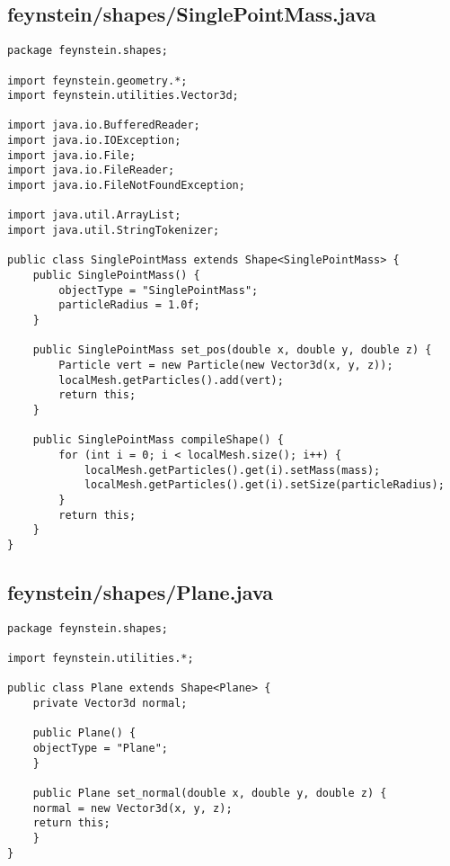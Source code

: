 \subsection*{feynstein/shapes/SinglePointMass.java}
\begin{lstlisting}
package feynstein.shapes;

import feynstein.geometry.*;
import feynstein.utilities.Vector3d;

import java.io.BufferedReader;
import java.io.IOException;
import java.io.File;
import java.io.FileReader;
import java.io.FileNotFoundException;

import java.util.ArrayList;
import java.util.StringTokenizer;

public class SinglePointMass extends Shape<SinglePointMass> {
	public SinglePointMass() {
		objectType = "SinglePointMass";
		particleRadius = 1.0f;
	}
    
	public SinglePointMass set_pos(double x, double y, double z) {
		Particle vert = new Particle(new Vector3d(x, y, z));
		localMesh.getParticles().add(vert);
		return this;
	}

    public SinglePointMass compileShape() {
		for (int i = 0; i < localMesh.size(); i++) {
			localMesh.getParticles().get(i).setMass(mass);
			localMesh.getParticles().get(i).setSize(particleRadius);
		}
		return this;
    }
}\end{lstlisting}

\subsection*{feynstein/shapes/Plane.java}
\begin{lstlisting}
package feynstein.shapes;

import feynstein.utilities.*;

public class Plane extends Shape<Plane> {
    private Vector3d normal;

    public Plane() {
	objectType = "Plane";
    }	

    public Plane set_normal(double x, double y, double z) {
	normal = new Vector3d(x, y, z);
	return this;
    }
}\end{lstlisting}

